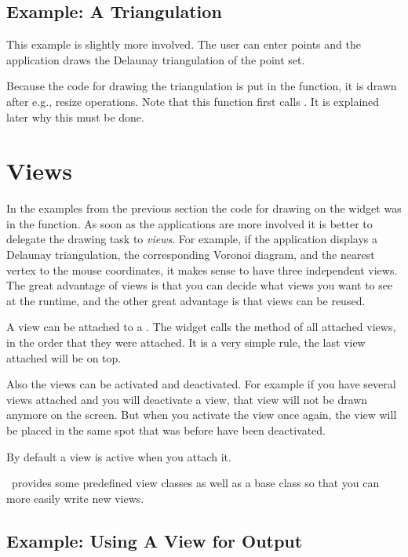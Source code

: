 \subsection{Example: A Triangulation}

This example is slightly more involved. The user can enter points and the application
draws the Delaunay triangulation of the point set. 


Because the code for drawing the triangulation is put in the  function, it is drawn after e.g., resize operations. Note that this function first calls . It is explained later why this must be done.

\section{Views}
\label{Qt_widget_views}

In the examples from the previous section the code for drawing on the
widget was in the  function. As soon as the applications are more 
involved it is better to delegate the drawing task to {\em views}. 
For example, if the application displays a Delaunay triangulation, the corresponding Voronoi diagram,
 and the nearest vertex to the mouse coordinates, it makes
sense to have three independent views. The great advantage of views is that you
 can decide what views you want to see at the runtime, and the other great 
advantage is that views can be reused.

A view can be attached to a . The widget calls the method  of all attached views, in the order 
that they were attached. It is a very simple rule, the last view attached will be on top.

Also the views can be activated and deactivated. For example if you have several views attached and you
will deactivate a view, that view will not be drawn anymore on the screen. But when you activate 
the view once again, the view will be placed in the same spot that was before have been deactivated.

By default a view is active when you attach it.

\cgal\ provides some predefined view classes as well as a base class
so that you can more easily write new views.


\subsection{Example: Using A View for Output}

